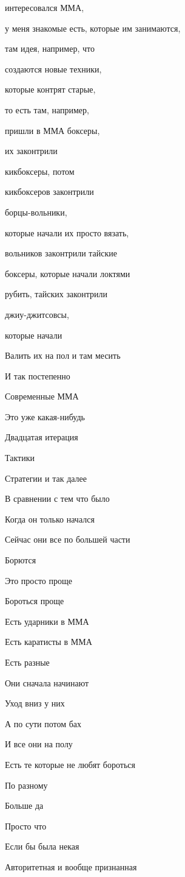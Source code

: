 интересовался ММА,

у меня знакомые есть, которые им занимаются,

там идея, например, что

создаются новые техники,

которые контрят старые,

то есть там, например,

пришли в ММА боксеры,

их законтрили

кикбоксеры, потом

кикбоксеров законтрили

борцы-вольники,

которые начали их просто вязать,

вольников законтрили тайские

боксеры, которые начали локтями

рубить, тайских законтрили

джиу-джитсовсы,

которые начали

Валить их на пол и там месить

И так постепенно

Современные ММА

Это уже какая-нибудь

Двадцатая итерация

Тактики

Стратегии и так далее

В сравнении с тем что было

Когда он только начался

Сейчас они все по большей части

Борются

Это просто проще

Бороться проще

Есть ударники в ММА

Есть каратисты в ММА

Есть разные

Они сначала начинают

Уход вниз у них

А по сути потом бах

И все они на полу

Есть те которые не любят бороться

По разному

Больше да

Просто что

Если бы была некая

Авторитетная и вообще признанная

